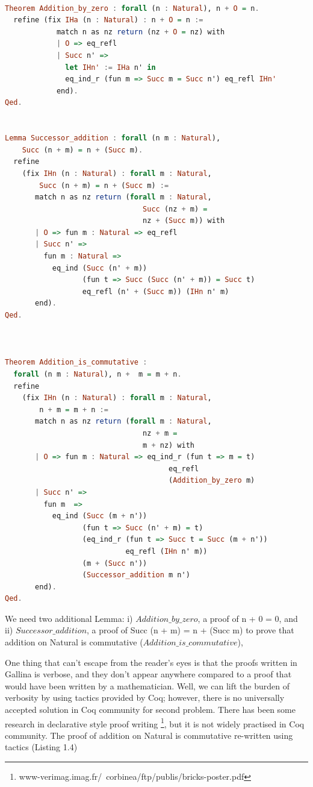 \begin{lstlisting}[language=haskell, numbers=none, basicstyle=\ttfamily,  caption=Addition function for Natural Numbers,  captionpos=b, xleftmargin=.1\textwidth]

Theorem Addition_by_zero : forall (n : Natural), n + O = n.
  refine (fix IHa (n : Natural) : n + O = n :=
            match n as nz return (nz + O = nz) with
            | O => eq_refl
            | Succ n' =>
              let IHn' := IHa n' in
              eq_ind_r (fun m => Succ m = Succ n') eq_refl IHn'
            end).
Qed.

  
Lemma Successor_addition : forall (n m : Natural),
    Succ (n + m) = n + (Succ m).
  refine
    (fix IHn (n : Natural) : forall m : Natural,
        Succ (n + m) = n + (Succ m) :=
       match n as nz return (forall m : Natural,
                                Succ (nz + m) =
                                nz + (Succ m)) with
       | O => fun m : Natural => eq_refl
       | Succ n' =>
         fun m : Natural =>
           eq_ind (Succ (n' + m))
                  (fun t => Succ (Succ (n' + m)) = Succ t)
                  eq_refl (n' + (Succ m)) (IHn n' m)
       end).
Qed.
     

    
Theorem Addition_is_commutative :
  forall (n m : Natural), n +  m = m + n.
  refine
    (fix IHn (n : Natural) : forall m : Natural,
        n + m = m + n :=
       match n as nz return (forall m : Natural,
                                nz + m =
                                m + nz) with
       | O => fun m : Natural => eq_ind_r (fun t => m = t)
                                      eq_refl
                                      (Addition_by_zero m)
       | Succ n' =>
         fun m  =>
           eq_ind (Succ (m + n'))
                  (fun t => Succ (n' + m) = t)
                  (eq_ind_r (fun t => Succ t = Succ (m + n'))
                            eq_refl (IHn n' m))
                  (m + (Succ n'))
                  (Successor_addition m n')
       end).
Qed.


\end{lstlisting}


We need two additional Lemma:
 i) $Addition\_by\_zero$, a proof of n + 0 = 0,
 and ii) $Successor\_addition$, a proof of Succ (n + m) = n + (Succ m) 
 to prove that addition on Natural is commutative ($Addition\_is\_commutative$), 
 
 One thing that can't escape from the reader's eyes is that the proofs written in Gallina is verbose, and they don't 
 appear anywhere compared to a proof that would have been written by a mathematician. Well, we can lift the burden 
 of verbosity by using tactics provided by Coq; however, there is no universally accepted solution in Coq community 
 for second problem. There has been some research in declarative style proof writing 
 \footnote{www-verimag.imag.fr/~corbinea/ftp/publis/bricks-poster.pdf}, but it is not widely practised in Coq 
 community. The proof of addition on Natural is commutative re-written using tactics (Listing 1.4)
 
